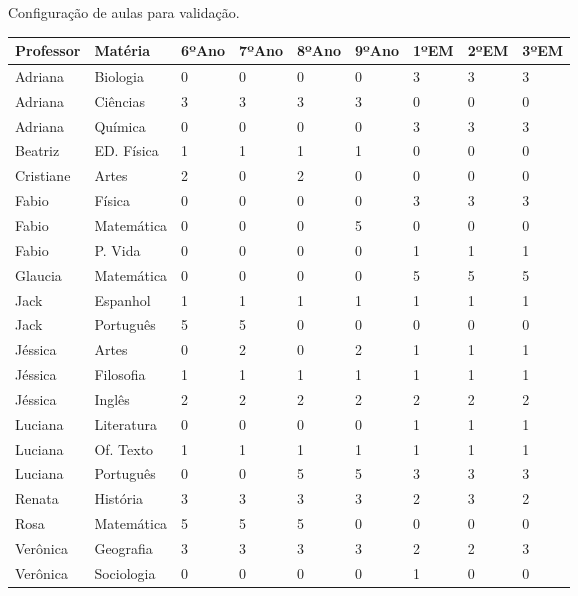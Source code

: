 \begin{quadro}[!htb]
	\centering
	\caption{Configuração de aulas para validação.\label{qua:validacao}}
	\begin{tabular}{|p{2cm}|p{2cm}|p{1cm}|p{1cm}|p{1cm}|p{1cm}|p{1cm}|p{1cm}|p{1cm}|}
		\hline
		\textbf{Professor} & \textbf{Matéria} & \textbf{6ºAno} & \textbf{7ºAno} & \textbf{8ºAno} & \textbf{9ºAno} & \textbf{1ºEM} & \textbf{2ºEM} & \textbf{3ºEM} \\
		\hline
		Adriana & Biologia & 0 & 0 & 0 & 0 & 3 & 3 & 3 \\
		\hline
		Adriana & Ciências & 3 & 3 & 3 & 3 & 0 & 0 & 0 \\
		\hline
		Adriana & Química & 0 & 0 & 0 & 0 & 3 & 3 & 3 \\
		\hline
		Beatriz & ED. Física & 1 & 1 & 1 & 1 & 0 & 0 & 0 \\
		\hline
		Cristiane & Artes & 2 & 0 & 2 & 0 & 0 & 0 & 0 \\
		\hline
		Fabio & Física & 0 & 0 & 0 & 0 & 3 & 3 & 3 \\
		\hline
		Fabio & Matemática & 0 & 0 & 0 & 5 & 0 & 0 & 0 \\
		\hline
		Fabio & P. Vida & 0 & 0 & 0 & 0 & 1 & 1 & 1 \\
		\hline
		Glaucia & Matemática & 0 & 0 & 0 & 0 & 5 & 5 & 5 \\
		\hline
		Jack & Espanhol & 1 & 1 & 1 & 1 & 1 & 1 & 1 \\
		\hline
		Jack & Português & 5 & 5 & 0 & 0 & 0 & 0 & 0 \\
		\hline
		Jéssica & Artes & 0 & 2 & 0 & 2 & 1 & 1 & 1 \\
		\hline
		Jéssica & Filosofia & 1 & 1 & 1 & 1 & 1 & 1 & 1 \\
		\hline
		Jéssica & Inglês & 2 & 2 & 2 & 2 & 2 & 2 & 2 \\
		\hline
		Luciana & Literatura & 0 & 0 & 0 & 0 & 1 & 1 & 1 \\
		\hline
		Luciana & Of. Texto & 1 & 1 & 1 & 1 & 1 & 1 & 1 \\
		\hline
		Luciana & Português & 0 & 0 & 5 & 5 & 3 & 3 & 3 \\
		\hline
		Renata & História & 3 & 3 & 3 & 3 & 2 & 3 & 2 \\
		\hline
		Rosa & Matemática & 5 & 5 & 5 & 0 & 0 & 0 & 0 \\
		\hline
		Verônica & Geografia & 3 & 3 & 3 & 3 & 2 & 2 & 3 \\
		\hline
		Verônica & Sociologia & 0 & 0 & 0 & 0 & 1 & 0 & 0 \\
		\hline
	\end{tabular}
\end{quadro}

